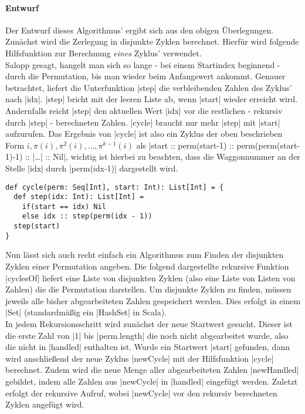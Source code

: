 \paragraph{Entwurf}
\label{slow_cycler}
Der Entwurf dieses Algorithmus' ergibt sich aus den obigen Überlegungen. Zunächst wird die Zerlegung in disjunkte Zyklen berechnet.
Hierfür wird folgende Hilfsfunktion zur Berechnung \emph{eines} Zyklus' verwendet.\\
Salopp gesagt, hangelt man sich so lange - bei einem Startindex beginnend - durch die Permutation, bis man wieder beim Anfangswert ankommt.
Genauer betrachtet, liefert die Unterfunktion |step| die verbleibenden Zahlen des Zyklus' nach |idx|.
|step| bricht mit der leeren Liste ab, wenn |start| wieder erreicht wird.
Andernfalls reicht |step| den aktuellen Wert |idx| vor die restlichen - rekursiv durch |step| - berechneten Zahlen.
|cycle| braucht nur mehr |step| mit |start| aufzurufen.
Das Ergebnis von |cycle| ist also ein Zyklus der oben beschrieben Form $i, \pi(i), \pi^2(i), \dots, \pi^{k-1}(i)$
als |start :: perm(start-1) :: perm(perm(start-1)-1) :: |\dots| :: Nil|,
wichtig ist hierbei zu beachten, dass die Waggonnummer an der Stelle |idx| durch |perm(idx-1)| dargestellt wird.\\
\lstset{language=Scala}
\lstset{basicstyle=\ttfamily\normalsize}
\begin{lstlisting}
def cycle(perm: Seq[Int], start: Int): List[Int] = {
  def step(idx: Int): List[Int] =
    if(start == idx) Nil
    else idx :: step(perm(idx - 1))
  step(start)
}
\end{lstlisting}
Nun lässt sich auch recht einfach ein Algorithmus zum Finden der disjunkten Zyklen einer Permutation angeben.
Die folgend dargestellte rekursive Funktion |cyclesOf| liefert eine Liste von disjunkten Zyklen (also eine Liste von Listen von Zahlen)
die die Permutation darstellen. Um disjunkte Zyklen zu finden, müssen jeweils alle bisher abgearbeiteten Zahlen gespeichert werden.
Dies erfolgt in einem |Set| (standardmäßig ein |HashSet| in Scala). \\
In jedem Rekursionsschritt wird zunächst der neue Startwert gesucht.
Dieser ist die erste Zahl von |1| bis |perm.length| die noch nicht abgearbeitet wurde, also die nicht in |handled| enthalten ist.
Wurde ein Startwert |start| gefunden, dann wird anschließend der neue Zyklus |newCycle| mit der Hilfsfunktion |cycle| berechnet.
Zudem wird die neue Menge aller abgearbeiteten Zahlen |newHandled| gebildet, indem alle Zahlen aus |newCycle| in |handled| eingefügt werden.
Zuletzt erfolgt der rekursive Aufruf, wobei |newCycle| vor den rekursiv berechneten Zyklen angefügt wird.
